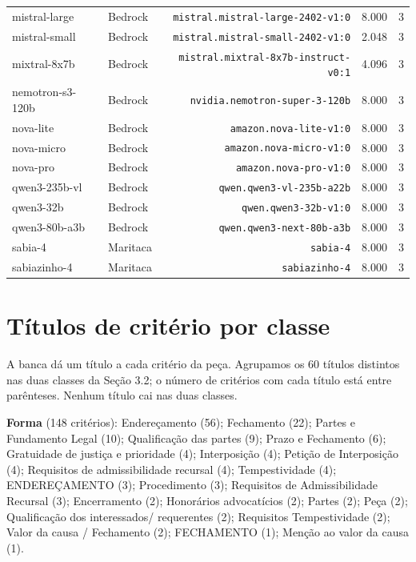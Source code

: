 \documentclass{IOS-Book-Article}
\begin{document}
\begin{table}[!ht]
\begin{tabular}{llrrr}
mistral-large & Bedrock & \texttt{mistral.mistral-large-2402-v1:0} & 8.000 & 3 \\
mistral-small & Bedrock & \texttt{mistral.mistral-small-2402-v1:0} & 2.048 & 3 \\
mixtral-8x7b & Bedrock & \texttt{mistral.mixtral-8x7b-instruct-v0:1} & 4.096 & 3 \\
nemotron-s3-120b & Bedrock & \texttt{nvidia.nemotron-super-3-120b} & 8.000 & 3 \\
nova-lite & Bedrock & \texttt{amazon.nova-lite-v1:0} & 8.000 & 3 \\
nova-micro & Bedrock & \texttt{amazon.nova-micro-v1:0} & 8.000 & 3 \\
nova-pro & Bedrock & \texttt{amazon.nova-pro-v1:0} & 8.000 & 3 \\
qwen3-235b-vl & Bedrock & \texttt{qwen.qwen3-vl-235b-a22b} & 8.000 & 3 \\
qwen3-32b & Bedrock & \texttt{qwen.qwen3-32b-v1:0} & 8.000 & 3 \\
qwen3-80b-a3b & Bedrock & \texttt{qwen.qwen3-next-80b-a3b} & 8.000 & 3 \\
sabia-4 & Maritaca & \texttt{sabia-4} & 8.000 & 3 \\
sabiazinho-4 & Maritaca & \texttt{sabiazinho-4} & 8.000 & 3 \\
\hline
\end{tabular}
\end{table}


\section{Títulos de critério por classe}

A banca dá um título a cada critério da peça. Agrupamos os 60 títulos distintos nas duas classes da Seção 3.2; o número de critérios com cada título está entre parênteses. Nenhum título cai nas duas classes.

\textbf{Forma} (148 critérios): Endereçamento (56); Fechamento (22); Partes e Fundamento Legal (10); Qualificação das partes (9); Prazo e Fechamento (6); Gratuidade de justiça e prioridade (4); Interposição (4); Petição de Interposição (4); Requisitos de admissibilidade recursal (4); Tempestividade (4); ENDEREÇAMENTO (3); Procedimento (3); Requisitos de Admissibilidade Recursal (3); Encerramento (2); Honorários advocatícios (2); Partes (2); Peça (2); Qualificação dos interessados/ requerentes (2); Requisitos Tempestividade (2); Valor da causa / Fechamento (2); FECHAMENTO (1); Menção ao valor da causa (1).
\end{document}
